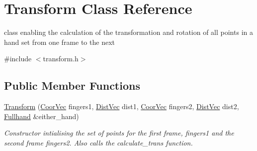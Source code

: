 \hypertarget{classTransform}{
\section{Transform Class Reference}
\label{classTransform}
}


class enabling the calculation of the transformation and rotation of all points in a hand set from one frame to the next  




{\ttfamily \#include $<$transform.h$>$}

\subsection*{Public Member Functions}
\begin{DoxyCompactItemize}
\item 
\hyperlink{classTransform_ad0bbbe9a52e032e5a03316b4d8a5a9d8}{Transform} (\hyperlink{blobby_8h_a7017012a1393f7249d0e03d6ac9f1c7b}{CoorVec} fingers1, \hyperlink{transform_8h_af617b6161d0af4668c255bbe3894b22d}{DistVec} dist1, \hyperlink{blobby_8h_a7017012a1393f7249d0e03d6ac9f1c7b}{CoorVec} fingers2, \hyperlink{transform_8h_af617b6161d0af4668c255bbe3894b22d}{DistVec} dist2, \hyperlink{classFullhand}{Fullhand} \&either\_\-hand)
\begin{DoxyCompactList}\small\item\em Constructor intialising the set of points for the first frame, {\itshape fingers1\/} and the second frame {\itshape fingers2\/}. Also calls the calculate\_\-trans function. \end{DoxyCompactList}\end{DoxyCompactItemize}
